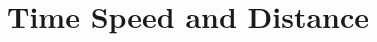 \documentclass{book}
\begin{document}
% 

% 

\chapter{Time Speed and Distance}





% 




% 

\end{document}
